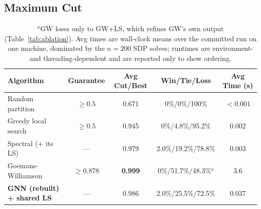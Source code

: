 \documentclass[11pt]{article}
\begin{document}
\subsection{Maximum Cut}
\label{sec:maxcut}

\begin{table}[h]
\centering
\caption{Max-Cut results across 600 committed-run instances (5 families $\times$ 4 sizes $\times$ 30). Every learned or constructed partition may be refined by the same 1-opt local search. Win/tie/loss = strict comparison against every other method. GNN row: the rebuilt model, canonical (seed-42) run.}
\label{tab:maxcut}
\begin{tabular}{lcccc}
\toprule
\textbf{Algorithm} & \textbf{Guarantee} & \textbf{Avg Cut/Best} & \textbf{Win/Tie/Loss} & \textbf{Avg Time (s)} \\
\midrule
Random partition & $\geq 0.5$ & 0.671 & 0\%/0\%/100\% & $< 0.001$ \\
Greedy local search & $\geq 0.5$ & 0.945 & 0\%/4.8\%/95.2\% & 0.002 \\
Spectral (+ its LS) & --- & 0.979 & 2.0\%/19.2\%/78.8\% & 0.003 \\
Goemans-Williamson & $\geq 0.878$ & \textbf{0.999} & 0\%/51.7\%/48.3\%$^{a}$ & 3.6 \\
\textbf{GNN (rebuilt) + shared LS} & --- & 0.986 & 2.0\%/25.5\%/72.5\% & 0.037 \\
\bottomrule
\end{tabular}
\caption*{\footnotesize $^{a}$GW loses only to GW+LS, which refines GW's own output (Table~\ref{tab:ablation}).
Avg times are wall-clock means over the committed run on one machine, dominated by the $n{=}200$ SDP solves;
runtimes are environment- and threading-dependent and are reported only to show ordering.}
\end{table}
\end{document}

